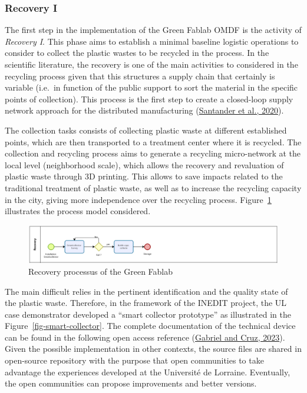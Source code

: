 \documentclass[
  11pt,
]{article}
\begin{document}
\hypertarget{recovery-i}{%
\subsubsection{Recovery I}\label{recovery-i}}

The first step in the implementation of the Green Fablab OMDF is the
activity of \emph{Recovery I}. This phase aims to establish a minimal
baseline logistic operations to consider to collect the plastic wastes
to be recycled in the process. In the scientific literature, the
recovery is one of the main activities to considered in the recycling
process given that this structures a supply chain that certainly is
variable (i.e.~in function of the public support to sort the material in
the specific points of collection). This process is the first step to
create a closed-loop supply network approach for the distributed
manufacturing (\protect\hyperlink{ref-Santander2020}{Santander et al.,
2020}).

The collection tasks consists of collecting plastic waste at different
established points, which are then transported to a treatment center
where it is recycled. The collection and recycling process aims to
generate a recycling micro-network at the local level (neighborhood
scale), which allows the recovery and revaluation of plastic waste
through 3D printing. This allows to save impacts related to the
traditional treatment of plastic waste, as well as to increase the
recycling capacity in the city, giving more independence over the
recycling process. Figure~\ref{fig-recovery} illustrates the process
model considered.

\begin{figure}[H]

{\centering \includegraphics{figures/Recovery.png}

}

\caption{\label{fig-recovery}Recovery processus of the Green Fablab}

\end{figure}

The main difficult relies in the pertinent identification and the
quality state of the plastic waste. Therefore, in the framework of the
INEDIT project, the UL case demonstrator developed a ``smart collector
prototype'' as illustrated in the Figure~\ref{fig-smart-collector}. The
complete documentation of the technical device can be found in the
following open access reference
(\protect\hyperlink{ref-gabriel2023}{Gabriel and Cruz, 2023}). Given the
possible implementation in other contexts, the source files are shared
in open-source repository with the purpose that open communities to take
advantage the experiences developed at the Université de Lorraine.
Eventually, the open communities can propose improvements and better
versions.
\end{document}
